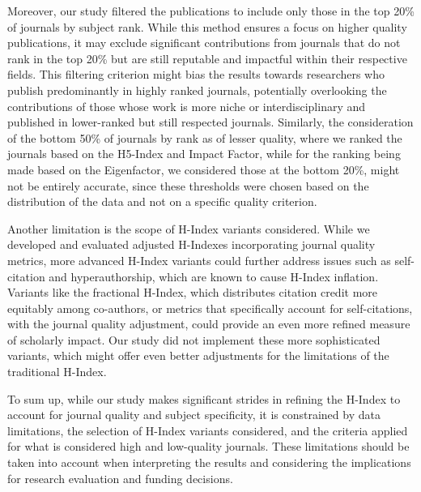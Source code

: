 Moreover, our study filtered the publications to include only those in the top
20\% of journals by subject rank. While this method ensures a focus on
higher quality publications, it may exclude significant contributions from
journals that do not rank in the top 20\% but are still reputable and impactful
within their respective fields. This filtering criterion might bias the results
towards researchers who publish predominantly in highly ranked journals,
potentially overlooking the contributions of those whose work is more niche or
interdisciplinary and published in lower-ranked but still respected journals.
Similarly, the consideration of the bottom 50\% of journals by rank as of
lesser quality, where we ranked the journals based on the H5-Index and Impact
Factor, while for the ranking being made based on the Eigenfactor, we
considered those at the bottom 20\%, might not be entirely accurate, since
these thresholds were chosen based on the distribution of the data and not on a
specific quality criterion. %

Another limitation is the scope of H-Index variants considered. While we
developed and evaluated adjusted H-Indexes incorporating journal quality
metrics, more advanced H-Index variants could further address issues such as
self-citation and hyperauthorship, which are known to cause H-Index inflation.
Variants like the fractional H-Index, which distributes citation credit more
equitably among co-authors, or metrics that specifically account for
self-citations, with the journal quality adjustment, could provide an even more
refined measure of scholarly impact. Our study did not implement these more
sophisticated variants, which might offer even better adjustments for the
limitations of the traditional H-Index.

To sum up, while our study makes significant strides in refining the H-Index to
account for journal quality and subject specificity, it is constrained by data
limitations, the selection of H-Index variants considered, and the
criteria applied for what is considered high and low-quality journals. These
limitations should be taken into account when interpreting the results and
considering the implications for research evaluation and funding decisions.
